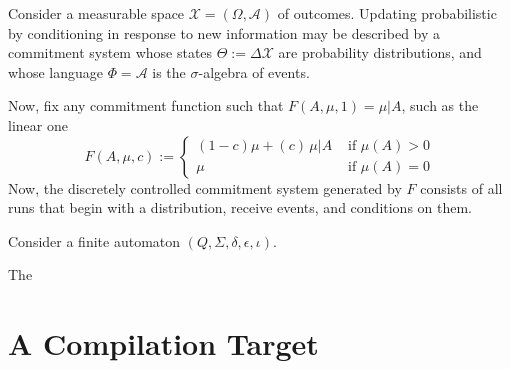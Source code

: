 \documentclass{article}
\begin{document}
\begin{example}
    Consider a measurable space $\mathcal X = (\Omega, \mathcal A)$ of outcomes.
    Updating probabilistic by conditioning in response to new information may be described by a commitment system whose states $\Theta := \Delta \mathcal X$ are probability distributions, and whose language $\Phi = \mathcal A$ is the $\sigma$-algebra of events. 
    
    Now, fix any commitment function such that $F(A,\mu,1) = \mu | A$, such as the linear one 
    \[ 
        F(A, \mu, c) := 
         \begin{cases}
            (1-c) \mu + (c)\, \mu | A & \text{~if~} \mu(A) > 0 \\
            \mu & \text{~if~} \mu(A)=0
        \end{cases}
    \]
    Now, the discretely controlled commitment system generated by $F$ consists of all runs that begin with a distribution, receive events, and conditions on them. 
\end{example}

\begin{example}
    Consider a finite automaton $(Q, \Sigma, \delta, \epsilon, \iota)$.
    
    The 
\end{example}




\section{A Compilation Target}

\begin{center}
\end{center}
\end{document}
